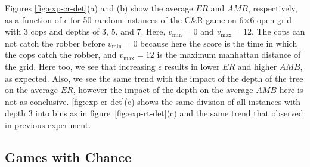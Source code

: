 \documentclass[runningheads]{llncs}
\newcommand{\vmax}{v_{\text{max}}}
\newcommand{\vmin}{v_{\text{min}}}
\newcommand{\amb}{\mathit{AMB}}
\newcommand{\er}{\mathit{ER}}
\begin{document}
Figures \ref{fig:exp-cr-det}(a) and (b) show the average $\er$ and $\amb$, respectively, as a function of  $\epsilon$ for 50 random instances of the C\&R game on 6$\times$6 open grid with 3 cops and depths of $3$, $5$, and $7$. Here, $\vmin=0$ and $\vmax=12$. The cops can not catch the robber before $\vmin=0$ because here the score is the time in which the cops catch the robber, and $\vmax=12$ is the maximum manhattan distance of the grid.
Here too, we see that increasing $\epsilon$ results in lower $\er$ and higher $\amb$, as expected. Also, we see the same trend with the impact of the depth of the tree on the average $\er$, however the impact of the depth  on the average $\amb$
here is not as conclusive. \ref{fig:exp-cr-det}(c) shows the same division of all instances with depth 3 into bins as in figure~\ref{fig:exp-rt-det}(c) and the same trend that observed in previous experiment. 

\subsection{Games with Chance}

\end{document}
